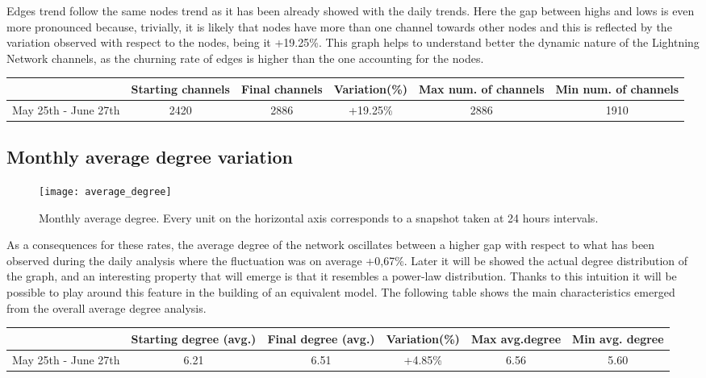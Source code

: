 	Edges trend follow the same nodes trend as it has been already showed with the daily trends. Here the gap between highs and lows is even more pronounced because, trivially, it is likely that nodes have more than one channel towards other nodes and this is reflected by the variation observed with respect to the nodes, being it +19.25\%. This graph helps to understand better the dynamic nature of the Lightning Network channels, as the churning rate of edges is higher than the one accounting for the nodes. 
	
	\begin{center}
		\begin{tabulary}{\linewidth}{| L | C | C | C | C | C |}
			\hline	
			& Starting channels & Final channels  & Variation(\%) & Max num. of channels & Min num. of channels \\ \hline
			May 25th - June 27th & 2420 & 2886 & +19.25\% & 2886 & 1910 \\ \hline
		\end{tabulary}
	\end{center}
	
	\subsection{Monthly average degree variation}
	
	\begin{figure}
		\centering
		\texttt{[image: average\_degree]}
		\caption{Monthly average degree. Every unit on the horizontal axis corresponds to a snapshot taken at 24 hours intervals.}
		\label{monthly_degree}
	\end{figure}
	
	As a consequences for these rates, the average degree of the network oscillates between a higher gap with respect to what has been observed during the daily analysis where the fluctuation was on average +0,67\%. Later it will be showed the actual degree distribution of the graph, and an interesting property that will emerge is that it resembles a power-law distribution. Thanks to this intuition it will be possible to play around this feature in the building of an equivalent model. The following table shows the main characteristics emerged from the overall average degree analysis.
	
	\begin{center}
		\begin{tabulary}{\linewidth}{| L | C | C | C | C | C |}
			\hline	
			& Starting degree (avg.) & Final degree (avg.)  & Variation(\%) & Max avg.degree & Min avg. degree \\ \hline
			May 25th - June 27th & 6.21 & 6.51 & +4.85\% & 6.56 & 5.60 \\ \hline
		\end{tabulary}
	\end{center}
	
